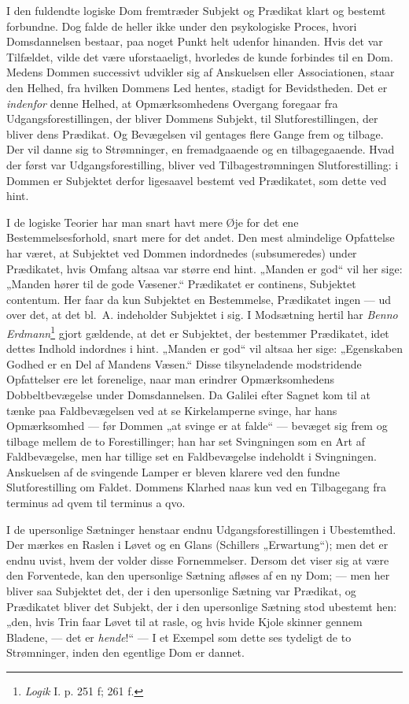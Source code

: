 \documentclass[12pt,a4paper]{book}
\newcommand{\apage}[1]{\marginnote{\footnotesize\textit{[#1]}}}
\begin{document}
I den fuldendte logiske Dom fremtræder Subjekt og Prædikat klart og
bestemt forbundne. Dog falde de heller ikke under den psykologiske
Proces, hvori Domsdannelsen bestaar, paa noget Punkt helt udenfor
hinanden. Hvis det var Tilfældet, vilde det være uforstaaeligt,
hvorledes de kunde forbindes til en Dom. Medens Dommen successivt
udvikler sig af Anskuelsen eller Associationen, staar den Helhed, fra
hvilken Dommens Led hentes, stadigt for Bevidstheden. Det er \emph{indenfor} denne Helhed, at Opmærksomhedens Overgang foregaar fra
Udgangsforestillingen, der bliver Dommens Subjekt, til
Slutforestillingen, der bliver dens Prædikat. Og Bevægelsen vil gentages
flere Gange frem og tilbage. Der vil danne sig to Strømninger, en
fremadgaaende og en tilbagegaaende. Hvad der først var
Udgangsforestilling, bliver ved Tilbagestrømningen Slutforestilling: i
Dommen er Subjektet derfor ligesaavel bestemt ved Prædikatet, som dette
ved hint.

I de logiske Teorier har man snart havt mere Øje for det ene
Bestemmelsesforhold, snart mere for det andet. Den mest almindelige
Opfattelse har været, at Subjektet ved Dommen indordnedes (subsumeredes)
under Prædikatet, hvis Omfang altsaa var større end hint. „Manden er
god“ vil her sige: „Manden hører til de gode Væsener.“ Prædikatet er
continens, Subjektet contentum. Her faar da kun Subjektet en
Bestemmelse, Prædikatet ingen --- ud over det, at det bl.\ A. indeholder
Subjektet i sig. I Modsætning hertil har \emph{Benno Erdmann}\footnote{\emph{Logik}
I. p. 251 f; 261 f.} gjort gældende, at det er Subjektet, \apage{93} der bestemmer
Prædikatet, idet dettes Indhold indordnes i hint. „Manden er god“ vil
altsaa her sige: „Egenskaben Godhed er en Del af Mandens Væsen.“ Disse
tilsyneladende modstridende Opfattelser ere let forenelige, naar man
erindrer Opmærksomhedens Dobbeltbevægelse under Domsdannelsen. Da
Galilei efter Sagnet kom til at tænke paa Faldbevægelsen ved at se
Kirkelamperne svinge, har hans Opmærksomhed --- før Dommen „at svinge er
at falde“ --- bevæget sig frem og tilbage mellem de to Forestillinger;
han har set Svingningen som en Art af Faldbevægelse, men har tillige set
en Faldbevægelse indeholdt i Svingningen. Anskuelsen af de svingende
Lamper er bleven klarere ved den fundne Slutforestilling om Faldet.
Dommens Klarhed naas kun ved en Tilbagegang fra terminus ad qvem til
terminus a qvo.

I de upersonlige Sætninger henstaar endnu Udgangsforestillingen i
Ubestemthed. Der mærkes en Raslen i Løvet og en Glans (Schillers
„Erwartung“); men det er endnu uvist, hvem der volder disse
Fornemmelser. Dersom det viser sig at være den Forventede, kan den
upersonlige Sætning afløses af en ny Dom; --- men her bliver saa
Subjektet det, der i den upersonlige Sætning var Prædikat, og Prædikatet
bliver det Subjekt, der i den upersonlige Sætning stod ubestemt hen:
„den, hvis Trin faar Løvet til at rasle, og hvis hvide Kjole skinner
gennem Bladene, --- det er \emph{hende}!“ --- I et Exempel som dette ses
tydeligt de to Strømninger, inden den egentlige Dom er dannet.
\end{document}
